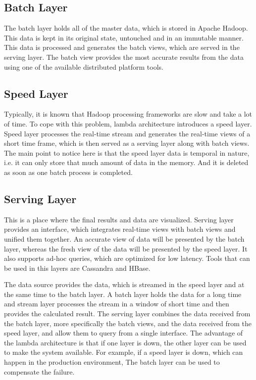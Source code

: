 \subsection{Batch Layer}
The batch layer holds all of the master data, which is stored in Apache Hadoop. This data is kept in its original state, untouched and in an immutable manner. This data is processed and generates the batch views, which are served in the serving layer. The batch view provides the most accurate results from the data using one of the available distributed platform tools.

\subsection{Speed Layer}
Typically, it is known that Hadoop processing frameworks are slow and take a lot of time. To cope with this problem, lambda architecture introduces a speed layer. Speed layer processes the real-time stream and generates the real-time views of a short time frame, which is then served as a serving layer along with batch views. The main point to notice here is that the speed layer data is temporal in nature, i.e. it can only store that much amount of data in the memory. And it is deleted as soon as one batch process is completed.

\subsection{Serving Layer}
This is a place where the final results and data are visualized. Serving layer provides an interface, which integrates real-time views with batch views and unified them together. An accurate view of data will be presented by the batch layer, whereas the fresh view of the data will be presented by the speed layer. It also supports ad-hoc queries, which are optimized for low latency. Tools that can be used in this layers are Cassandra and HBase.

The data source provides the data, which is streamed in the speed layer and at the same time to the batch layer. A batch layer holds the data for a long time and stream layer processes the stream in a window of short time and then provides the calculated result. The serving layer combines the data received from the batch layer, more specifically the batch views, and the data received from the speed layer, and allow them to query from a single interface. The advantage of the lambda architecture is that if one layer is down, the other layer can be used to make the system available. For example, if a speed layer is down, which can happen in the production environment, The batch layer can be used to compensate the failure.

